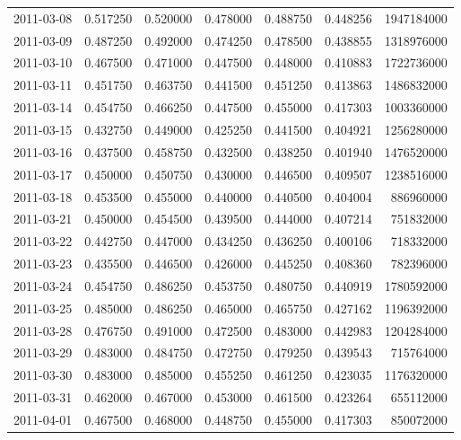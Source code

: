 \begin{tabular}{lrrrrrr}
2011-03-08 &    0.517250 &    0.520000 &    0.478000 &    0.488750 &    0.448256 &  1947184000 \\
2011-03-09 &    0.487250 &    0.492000 &    0.474250 &    0.478500 &    0.438855 &  1318976000 \\
2011-03-10 &    0.467500 &    0.471000 &    0.447500 &    0.448000 &    0.410883 &  1722736000 \\
2011-03-11 &    0.451750 &    0.463750 &    0.441500 &    0.451250 &    0.413863 &  1486832000 \\
2011-03-14 &    0.454750 &    0.466250 &    0.447500 &    0.455000 &    0.417303 &  1003360000 \\
2011-03-15 &    0.432750 &    0.449000 &    0.425250 &    0.441500 &    0.404921 &  1256280000 \\
2011-03-16 &    0.437500 &    0.458750 &    0.432500 &    0.438250 &    0.401940 &  1476520000 \\
2011-03-17 &    0.450000 &    0.450750 &    0.430000 &    0.446500 &    0.409507 &  1238516000 \\
2011-03-18 &    0.453500 &    0.455000 &    0.440000 &    0.440500 &    0.404004 &   886960000 \\
2011-03-21 &    0.450000 &    0.454500 &    0.439500 &    0.444000 &    0.407214 &   751832000 \\
2011-03-22 &    0.442750 &    0.447000 &    0.434250 &    0.436250 &    0.400106 &   718332000 \\
2011-03-23 &    0.435500 &    0.446500 &    0.426000 &    0.445250 &    0.408360 &   782396000 \\
2011-03-24 &    0.454750 &    0.486250 &    0.453750 &    0.480750 &    0.440919 &  1780592000 \\
2011-03-25 &    0.485000 &    0.486250 &    0.465000 &    0.465750 &    0.427162 &  1196392000 \\
2011-03-28 &    0.476750 &    0.491000 &    0.472500 &    0.483000 &    0.442983 &  1204284000 \\
2011-03-29 &    0.483000 &    0.484750 &    0.472750 &    0.479250 &    0.439543 &   715764000 \\
2011-03-30 &    0.483000 &    0.485000 &    0.455250 &    0.461250 &    0.423035 &  1176320000 \\
2011-03-31 &    0.462000 &    0.467000 &    0.453000 &    0.461500 &    0.423264 &   655112000 \\
2011-04-01 &    0.467500 &    0.468000 &    0.448750 &    0.455000 &    0.417303 &   850072000 \\

\end{tabular}
